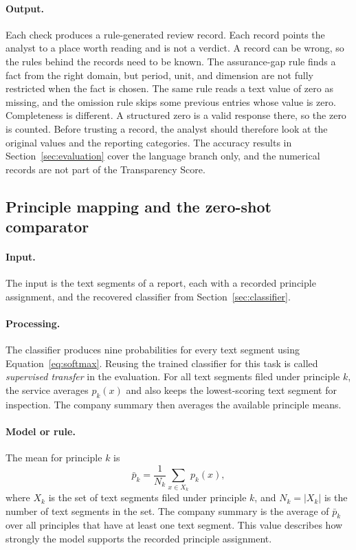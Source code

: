 \paragraph{Output.} Each check produces a rule-generated review record. Each record points the analyst to a place worth reading and is not a verdict. A record can be wrong, so the rules behind the records need to be known. The assurance-gap rule finds a fact from the right domain, but period, unit, and dimension are not fully restricted when the fact is chosen. The same rule reads a text value of zero as missing, and the omission rule skips some previous entries whose value is zero. Completeness is different. A structured zero is a valid response there, so the zero is counted. Before trusting a record, the analyst should therefore look at the original values and the reporting categories. The accuracy results in Section~\ref{sec:evaluation} cover the language branch only, and the numerical records are not part of the Transparency Score.

\subsection{Principle mapping and the zero-shot comparator}
\label{sec:mapping}

\paragraph{Input.} The input is the text segments of a report, each with a recorded principle assignment, and the recovered classifier from Section~\ref{sec:classifier}.

\paragraph{Processing.} The classifier produces nine probabilities for every text segment using Equation~\eqref{eq:softmax}. Reusing the trained classifier for this task is called \emph{supervised transfer} in the evaluation. For all text segments filed under principle $k$, the service averages $p_k(x)$ and also keeps the lowest-scoring text segment for inspection. The company summary then averages the available principle means.

\paragraph{Model or rule.} The mean for principle $k$ is
\begin{equation}
\bar{p}_k=\frac{1}{N_k}\sum_{x\in X_k}p_k(x),
\label{eq:mapmean}
\end{equation}
where $X_k$ is the set of text segments filed under principle $k$, and $N_k=|X_k|$ is the number of text segments in the set. The company summary is the average of $\bar{p}_k$ over all principles that have at least one text segment. This value describes how strongly the model supports the recorded principle assignment.

